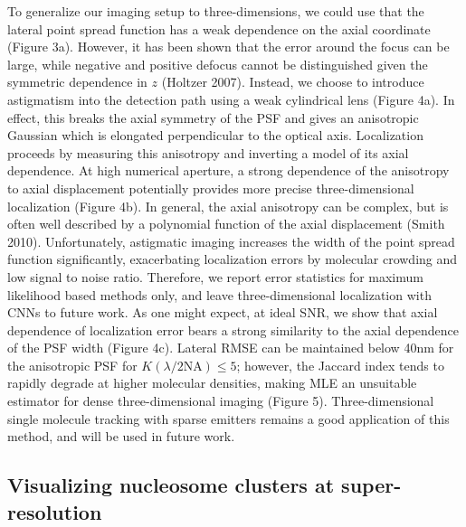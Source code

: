 \documentclass{ucetd}
\begin{document}
To generalize our imaging setup to three-dimensions, we could use that the lateral point spread function has a weak dependence on the axial coordinate (Figure 3a). However, it has been shown that the error around the focus can be large, while negative and positive defocus cannot be distinguished given the symmetric dependence in $z$ (Holtzer 2007). Instead, we choose to introduce astigmatism into the detection path using a weak cylindrical lens (Figure 4a). In effect, this breaks the axial symmetry of the PSF and gives an anisotropic Gaussian which is elongated perpendicular to the optical axis. Localization proceeds by measuring this anisotropy and inverting a model of its axial dependence. At high numerical aperture, a strong dependence of the anisotropy to axial displacement potentially provides more precise three-dimensional localization (Figure 4b). In general, the axial anisotropy can be complex, but is often well described by a polynomial function of the axial displacement (Smith 2010). Unfortunately, astigmatic imaging increases the width of the point spread function significantly, exacerbating localization errors by molecular crowding and low signal to noise ratio. Therefore, we report error statistics for maximum likelihood based methods only, and leave three-dimensional localization with CNNs to future work. As one might expect, at ideal SNR, we show that axial dependence of localization error bears a strong similarity to the axial dependence of the PSF width (Figure 4c). Lateral RMSE can be maintained below 40nm for the anisotropic PSF for $K(\lambda/2\mathrm{NA}) \leq 5$; however, the Jaccard index tends to rapidly degrade at higher molecular densities, making MLE an unsuitable estimator for dense three-dimensional imaging (Figure 5). Three-dimensional single molecule tracking with sparse emitters remains a good application of this method, and will be used in future work.


\subsection{Visualizing nucleosome clusters at super-resolution}
\end{document}
